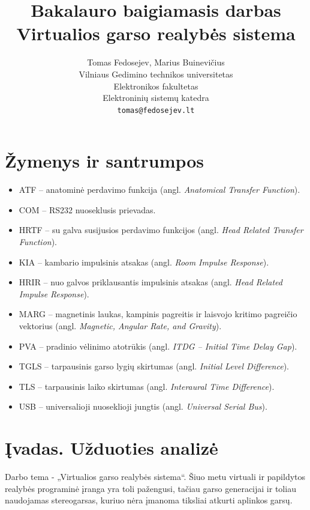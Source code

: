 \documentclass[]{vgtuef}
\author{Tomas Fedosejev, Marius Buinevičius\\Vilniaus Gedimino technikos
  universitetas\\Elektronikos fakultetas\\Elektroninių sistemų
  katedra\\\texttt{tomas@fedosejev.lt}}
\title{Bakalauro baigiamasis darbas\\Virtualios garso realybės sistema}
\begin{document}
\setcounter{page}{8}
\onehalfspacing

%  
%  
%  

\tableofcontents


\section*{Žymenys ir santrumpos}

\begin{itemize}
\item ATF -- anatominė perdavimo funkcija (angl. \textit{Anatomical Transfer Function}).
\item COM -- RS232 nuoseklusis prievadas.
\item HRTF -- su galva susijusios perdavimo funkcijos (angl. \textit{Head Related Transfer Function}).
\item KIA -- kambario impulsinis atsakas (angl. \textit{Room Impulse Response}).
\item HRIR -- nuo galvos priklausantis impulsinis atsakas (angl. \textit{Head Related Impulse Response}).
\item MARG -- magnetinis laukas, kampinis pagreitis ir laisvojo kritimo pagreičio vektorius (angl. \textit{Magnetic, Angular Rate, and Gravity}).
\item PVA -- pradinio vėlinimo atotrūkis (angl. \textit{ITDG – Initial Time Delay Gap}).
\item TGLS -- tarpausinis garso lygių skirtumas (angl. \textit{Initial Level Difference}).
\item TLS -- tarpausinis laiko skirtumas (angl. \textit{Interaural Time Difference}).
\item USB -- universalioji nuoseklioji jungtis (angl. \textit{Universal Serial Bus}).
\end{itemize}


\section{Įvadas. Užduoties analizė}

Darbo tema - „Virtualios garso realybės sistema“. Šiuo metu virtuali ir papildytos realybės programinė įranga yra toli pažengusi, tačiau garso generacijai ir toliau naudojamas stereogarsas, kuriuo nėra įmanoma tiksliai atkurti aplinkos garsų.
\end{document}
